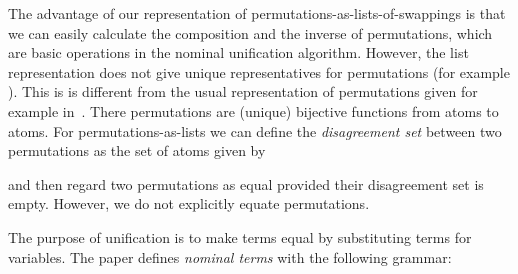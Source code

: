 \begin{isabellebody}
\begin{isamarkuptext}
  The advantage of our representation of permutations-as-lists-of-swappings is
  that we can easily calculate the composition and the inverse of
  permutations, which are basic operations in the nominal unification
  algorithm. However, the list representation does not give unique
  representatives for permutations (for example ). This is 
  is different from the usual representation of permutations given for example in~\cite{HuffmanUrban10}.
  There permutations are (unique) bijective functions from atoms to atoms. For permutations-as-lists 
  we can define the \emph{disagreement set} between two permutations as the set of atoms 
  given by

  \begin{center}
  \end{center}

  \noindent
  and then regard two permutations as equal provided their disagreement set is empty.
  However, we do not explicitly equate permutations.

  The purpose of unification is to make terms equal by substituting terms for variables. 
  The paper \cite{UrbanPittsGabbay04} defines \emph{nominal terms} with the following grammar:


\end{isamarkuptext}
\end{isabellebody}
